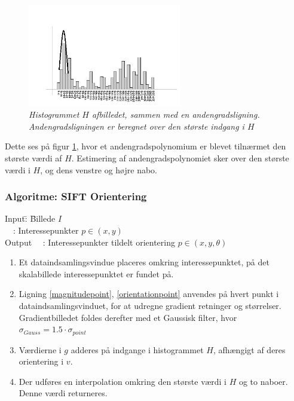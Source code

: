 \begin{figure}[H]
    \centering
    \includegraphics[width=0.60\textwidth]{fig/sift-orientation-histogram.jpg}
     \vspace{-1em}
    \begin{center}    
       \caption{{\footnotesize \textit{Histogrammet $H$ afbilledet, sammen med en andengradsligning. Andengradsligningen er beregnet over den største indgang i $H$}}}
    \label{histogramheight}
     \end{center}
     \vspace{-2.5em}
  \end{figure} \noindent
Dette ses på figur \ref{histogramheight}, hvor et andengradspolynomium er blevet tilnærmet den største værdi af $H$. Estimering af andengradspolynomiet sker over den største værdi i $H$, og dens venstre og højre nabo.


\subsubsection*{Algoritme: SIFT Orientering}
\begin{tabbing}
Input\quad \= : \= Billede $I$\\
$\text{ }$ \> : \> Interessepunkter $p  \in (x, y)$ \\
Output $\text{ }$ \> : \> Interessepunkter tildelt orientering $p \in (x,y, \theta)$
\end{tabbing}
\begin{enumerate}
\item Et dataindsamlingsvindue placeres omkring interessepunktet, på det skalabillede interessepunktet er fundet på.
\item Ligning \eqref{magnitudepoint}, \eqref{orientationpoint} anvendes på hvert punkt i dataindsamlingsvinduet, for at udregne gradient retninger og størrelser. Gradientbilledet foldes derefter med et Gaussisk filter, hvor $\sigma_{Gauss} = 1.5 \cdot \sigma_{point}$
\item Værdierne i $g$ adderes på indgange i histogrammet $H$, afhængigt af deres orientering i $v$.
\item  Der udføres en interpolation omkring den største værdi i $H$ og to naboer. Denne værdi returneres.
\end{enumerate}
